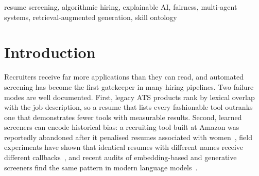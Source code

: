 \documentclass[conference]{IEEEtran}
\newcommand{\verd}[1]{\textsc{#1}}
\newcommand{\Sstrong}{\verd{Strong Hire}}
\begin{document}
\begin{abstract}
Keyword-based applicant tracking systems (ATS) reward vocabulary rather than evidence, and recent audits show that neural resume screeners can inherit demographic bias. We present an explainable, offline-capable recruitment system that treats a skill as a claim to be evidenced. It combines a 79-skill ontology with alias normalisation and partial-credit matching, a seven-factor hybrid ranker, evidence-weighted skill coverage, data-layer blind screening, a four-agent deterministic consensus council with knock-out gates, a GitHub authenticity inspector, and a retrieval-grounded recruiter copilot behind a React interface that uses progressive disclosure. On a 12-resume pilot, the system ranks a buzzword-stuffed 0.3-year resume 10th, whereas a keyword baseline ranks it 5th and scores it identically to a genuine four-year lateral candidate (Kendall $\tau=0.667$ between the two rankings). A full screen costs 29.6~ms per resume on a laptop CPU. Scores and verdicts are invariant to name substitution ($\Delta=0.0$ over 96 runs) and stable under $\pm20\%$ weight perturbation (mean $\tau=0.969$, 200 draws). On a 100-resume synthetic benchmark the system agrees exactly with the generation labels for 46 of 100 resumes and issues no \Sstrong{} verdict, a conservative calibration that we analyse. All data are synthetic, and we state the resulting limitations explicitly.
\end{abstract}

\begin{IEEEkeywords}
resume screening, algorithmic hiring, explainable AI, fairness, multi-agent systems, retrieval-augmented generation, skill ontology
\end{IEEEkeywords}

\section{Introduction}
Recruiters receive far more applications than they can read, and automated screening has become the first gatekeeper in many hiring pipelines. Two failure modes are well documented. First, legacy ATS products rank by lexical overlap with the job description, so a resume that lists every fashionable tool outranks one that demonstrates fewer tools with measurable results. Second, learned screeners can encode historical bias: a recruiting tool built at Amazon was reportedly abandoned after it penalised resumes associated with women~\cite{dastin}, field experiments have shown that identical resumes with different names receive different callbacks~\cite{bertrand}, and recent audits of embedding-based and generative screeners find the same pattern in modern language models~\cite{wilson,armstrong}.
\end{document}
